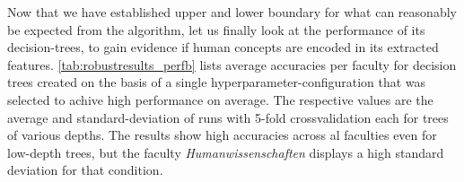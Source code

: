 \begin{figure}[h]
	\begin{center}
	\end{center}
\end{figure}

Now that we have established upper and lower boundary for what can reasonably be expected from the algorithm, let us finally look at the performance of its decision-trees, to gain evidence if human concepts are encoded in its extracted features. \autoref{tab:robustresults_perfb} lists average accuracies per faculty for decision trees created on the basis of a single hyperparameter-configuration that was selected to achive high performance on average. The respective values are the average and standard-deviation of runs with 5-fold crossvalidation each for trees of various depths. The results show high accuracies across al faculties even for low-depth trees, but the faculty \textit{Humanwissenschaften} displays a high standard deviation for that condition.

